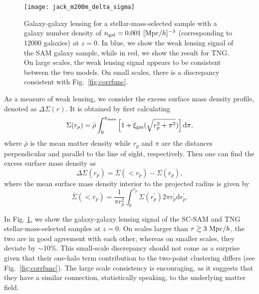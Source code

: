 \documentclass[fleqn,usenatbib]{mnras}
\newcommand{\rss}[1]{\textcolor{purple}{(rss: #1)}}
\begin{document}
\begin{figure}
\centering  
\texttt{[image: jack\_m200m\_delta\_sigma]}
\caption{Galaxy-galaxy lensing for a stellar-mass-selected sample with a galaxy number density of $n_{\rm gal} = 0.001 \ [{\rm Mpc}/h]^{-3}$ (corresponding to 12000 galaxies) at $z = 0$. In blue, we show the weak lensing signal of the SAM galaxy sample, while in red, we show the result for TNG. On large scales, the weak lensing signal appears to be consistent between the two models. On small scales, there is a discrepancy consistent with Fig.~\ref{fig:corrfunc}.}
\label{fig:gal_lens}
\end{figure}

As a measure of weak lensing, we consider the excess surface mass density profile, denoted as $\Delta \Sigma (r)$. It is obtained by first calculating
\begin{equation}
\Sigma(r_p) = \bar{\rho}\int_0^{\pi_{\rm max}} \left[1+\xi_{\rm gm}(\sqrt{r_p^2+\pi^2}) \right]\mathrm{d}\pi,
\end{equation}
where $\bar \rho$ is the mean matter density while $r_p$ and $\pi$ are the distances perpendicular and parallel to the line of sight, respectively. Then one can find the excess surface mass density as 
\begin{equation}
\Delta\Sigma(r_p) = \bar{\Sigma}(<r_p) - \Sigma(r_p),
\end{equation}
where the mean surface mass density interior to the projected radius is given by
\begin{equation}
\bar{\Sigma}(<r_p) = \frac{1}{\pi r_p^2}\int_0^{r_p}\Sigma(r_p^{\prime})2\pi r_p^{\prime} \mathrm{d}r_p^{\prime}.
\end{equation}

In Fig. \ref{fig:gal_lens}, we show the galaxy-galaxy lensing signal of the SC-SAM and TNG stellar-mass-selected samples at $z = 0$. On scales larger than $r \gtrsim 3 \ {\rm Mpc}/h$, the two are in good agreement with each other, whereas on smaller scales, they deviate by $\sim$10\%. This small-scale discrepancy should not come as a surprise given that their one-halo term contribution to the two-point clustering differs (see Fig.~\ref{fig:corrfunc}). The large scale consistency is encouraging, as it suggests that they have a similar connection, statistically speaking, to the underlying matter field. 
\end{document}
